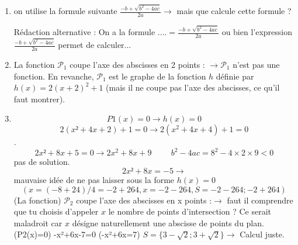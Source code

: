 \documentclass[a4paper,11pt]{article}
\theoremstyle{break}
\begin{document}
\begin{enumerate}
\item on utilise la formule suivante $\frac{-b+\sqrt{b^2-4ac}}{2a}\to$ mais que calcule
cette formule ?

Rédaction alternative : On a la formule ....$=\frac{-b+\sqrt{b^2-4ac}}{2a}$ ou bien
l'expression $\frac{-b+\sqrt{b^2-4ac}}{2a}$ permet de calculer... 

\item La fonction $\mathcal{P}_1$ coupe l’axe des abscisses en 2 points :
$\to \mathcal{P}_1$ n'est pas une fonction. En revanche, $\mathcal{P}_1$ est le graphe
de la fonction $h$ définie par $h(x)=2(x+2)^2+1$ 
(mais il ne coupe pas l'axe des abscisses, ce qu'il faut montrer).

\item
$$P1(x)=0\to h(x)=0$$
$$2(x²+4x+2)+1=0\to 2(x^2+4x+4)+1=0$$.
$$2x²+8x+5=0 \to 2x^2+8x+9 \hspace{1cm} b^2-4ac=8^2-4 \times 2 \times 9<0$$ pas de solution.
$$2x²+8x=-5 \to$$ mauvaise idée de ne pas laisser sous la forme $h(x)=0$
$$(x=(-8+24)/4=-2+264,x=-2-264,S={-2-264;-2+264})$$
(La fonction) $\mathcal{P}_2$ coupe l’axe des abscisses en x points :$\to$ faut il comprendre 
que tu choisis d'appeler $x$ le nombre de points d'intersection ? Ce serait maladroit
car $x$ désigne naturellement une abscisse de points du plan.  
(P2(x)=0)
-x²+6x-7=0
(-x²+6x=7)
$S=\{3-\sqrt{2};3+\sqrt{2}\} \to$ Calcul juste.
  
  \end{enumerate}
\end{document}
